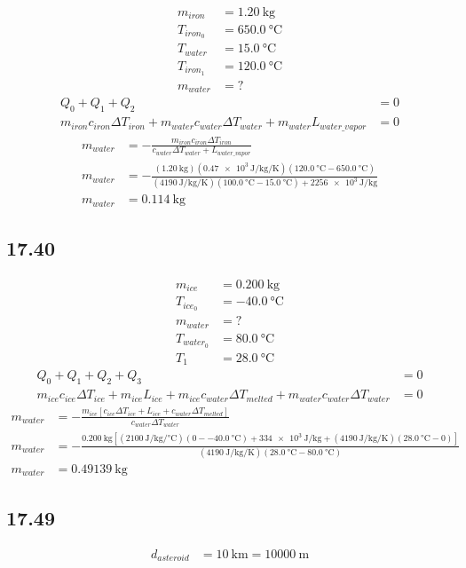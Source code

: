 \documentclass{article}
\begin{document}
\begin{align*}
	m_{iron} & = \SI{1.20}{\kilogram} \\
	T_{iron_0} & = \SI{650.0}{\celsius} \\
	T_{water} & = \SI{15.0}{\celsius} \\
	T_{iron_1} & = \SI{120.0}{\celsius} \\
	m_{water} & = ?
\end{align*}
\begin{align*}
	Q_0 + Q_1 + Q_2 & = 0 \\
	m_{iron}c_{iron}\Delta T_{iron} + m_{water}c_{water}\Delta T_{water} + m_{water}L_{water\_vapor} & = 0
\end{align*}
\begin{align*}
	m_{water} & = - \frac{ m_{iron}c_{iron}\Delta T_{iron} }{ c_{water}\Delta T_{water} + L_{water\_vapor} } \\
	m_{water} & = - \frac{ (\SI{1.20}{\kilogram})(\SI{0.47e3}{\joule \per \kilogram \per \kelvin})(\SI{120.0}{\celsius} - \SI{650.0}{\celsius}) }{ (\SI{4190}{\joule \per \kilogram \per \kelvin})(\SI{100.0}{\celsius} - \SI{15.0}{\celsius}) + \SI{2256e3}{\joule \per \kilogram} } \\
	m_{water} & = \SI{0.114}{\kilogram}
\end{align*}

\subsection{17.40}

\begin{align*}
	m_{ice} & = \SI{0.200}{\kilogram} \\
	T_{ice_0} & = \SI{-40.0}{\celsius} \\
	m_{water} & = ? \\
	T_{water_0} & = \SI{80.0}{\celsius} \\
	T_1 & = \SI{28.0}{\celsius}
\end{align*}
\begin{align*}
	Q_0 + Q_1 + Q_2 + Q_3 & = 0 \\
	m_{ice}c_{ice}\Delta T_{ice} + m_{ice}L_{ice} + m_{ice}c_{water}\Delta T_{melted} + m_{water}c_{water}\Delta T_{water} & = 0
\end{align*}
\begin{align*}
	m_{water} & = - \frac{ m_{ice} \left[ c_{ice}\Delta T_{ice} + L_{ice} + c_{water}\Delta T_{melted} \right] }{ c_{water}\Delta T_{water} } \\
	m_{water} & = - \frac{ \SI{0.200}{\kilogram} \left[ (\SI{2100}{\joule \per \kilogram \per \celsius})(0 - \SI{-40.0}{\celsius}) + \SI{334e3}{\joule \per \kilogram} + (\SI{4190}{\joule \per \kilogram \per \kelvin})(\SI{28.0}{\celsius} - 0) \right] }{ (\SI{4190}{\joule \per \kilogram \per \kelvin})(\SI{28.0}{\celsius} - \SI{80.0}{\celsius}) } \\
	m_{water} & = \SI{0.49139}{\kilogram}
\end{align*}

\subsection{17.49}

\begin{align*}
	d_{asteroid} & = \SI{10}{\kilo \meter} = \SI{10000}{\meter}
\end{align*}
\end{document}
